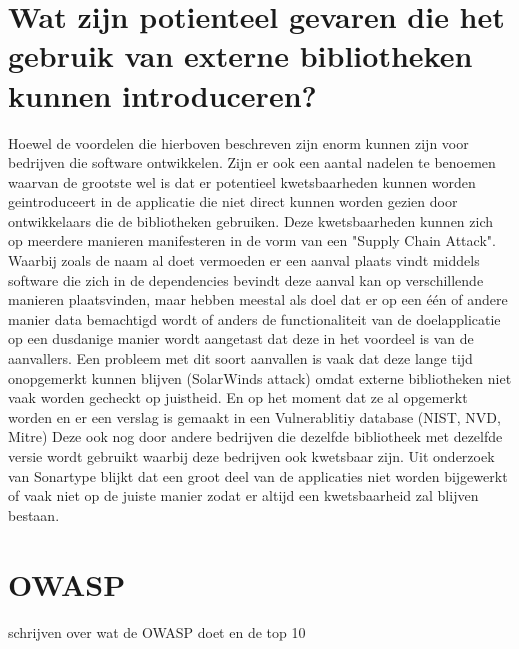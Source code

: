 \section{Wat zijn potienteel gevaren die het gebruik van externe bibliotheken kunnen introduceren?}\label{sec:wat-zijn-potienteel-gevaren-die-het-gebruik-van-externe-bibliotheken-kunnen-introduceren?}
Hoewel de voordelen die hierboven beschreven zijn enorm kunnen zijn voor bedrijven die software ontwikkelen. Zijn er ook een aantal nadelen te benoemen waarvan de grootste wel is dat er potentieel kwetsbaarheden kunnen worden geintroduceert in de applicatie die niet direct kunnen worden gezien door ontwikkelaars die de bibliotheken gebruiken. Deze kwetsbaarheden kunnen zich op meerdere manieren manifesteren in de vorm van een "Supply Chain Attack". Waarbij zoals de naam al doet vermoeden er een aanval plaats vindt middels software die zich in de dependencies bevindt deze aanval kan op verschillende manieren plaatsvinden, maar hebben meestal als doel dat er op een één of andere manier data bemachtigd wordt of anders de functionaliteit van de doelapplicatie op een dusdanige manier wordt aangetast dat deze in het voordeel is van de aanvallers. Een probleem met dit soort aanvallen is vaak dat deze lange tijd onopgemerkt kunnen blijven (SolarWinds attack) omdat externe bibliotheken niet vaak worden gecheckt op juistheid. En op het moment dat ze al opgemerkt worden en er een verslag is gemaakt in een Vulnerablitiy database (NIST, NVD, Mitre) Deze ook nog door andere bedrijven die dezelfde bibliotheek met dezelfde versie wordt gebruikt waarbij deze bedrijven ook kwetsbaar zijn. Uit onderzoek van Sonartype blijkt dat een groot deel van de applicaties niet worden bijgewerkt of vaak niet op de juiste manier zodat er altijd een kwetsbaarheid zal blijven bestaan.


\section{OWASP}\label{sec:owasp}
schrijven over wat de OWASP doet en de top 10

